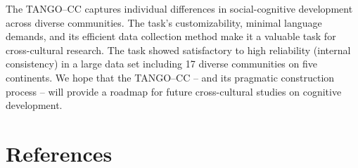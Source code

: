 \documentclass[
  man,floatsintext]{apa7}
\begin{document}
The TANGO--CC captures individual differences in social-cognitive development across diverse communities.
The task's customizability, minimal language demands, and its efficient data collection method make it a valuable task for cross-cultural research.
The task showed satisfactory to high reliability (internal consistency) in a large data set including 17 diverse communities on five continents.
We hope that the TANGO--CC -- and its pragmatic construction process -- will provide a roadmap for future cross-cultural studies on cognitive development.

\newpage

\section{References}\label{references}

\begingroup
\setlength{\parindent}{-0.5in}
\setlength{\leftskip}{0.5in}
\end{document}
